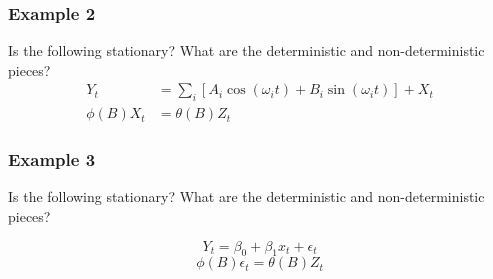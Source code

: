\documentclass{beamer}
\begin{document}

\begin{frame}
\frametitle{Example 2}

Is the following stationary? What are the deterministic and non-deterministic pieces?
\begin{align*}
Y_t &= \sum_i \left[ A_i \cos(\omega_i t) + B_i \sin(\omega_i t) \right]+ X_t\\
\phi(B) X_t &= \theta(B) Z_t
\end{align*}


\end{frame}




\begin{frame}
\frametitle{Example 3}


Is the following stationary? What are the deterministic and non-deterministic pieces?

\[
Y_t = \beta_0 + \beta_1 x_t + \epsilon_t
\]
\[
\phi(B) \epsilon_t = \theta(B) Z_t
\]
\end{frame}
\end{document}
